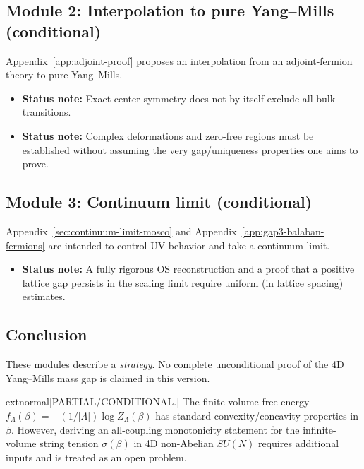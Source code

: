 \subsection{Module 2: Interpolation to pure Yang--Mills (conditional)}
Appendix~\ref{app:adjoint-proof} proposes an interpolation from an adjoint-fermion theory to pure Yang--Mills.
\begin{itemize}
    \item \textbf{Status note:} Exact center symmetry does not by itself exclude all bulk transitions.
    \item \textbf{Status note:} Complex deformations and zero-free regions must be established without assuming the very gap/uniqueness properties one aims to prove.
\end{itemize}

\subsection{Module 3: Continuum limit (conditional)}
Appendix~\ref{sec:continuum-limit-mosco} and Appendix~\ref{app:gap3-balaban-fermions} are intended to control UV behavior and take a continuum limit.
\begin{itemize}
    \item \textbf{Status note:} A fully rigorous OS reconstruction and a proof that a positive lattice gap persists in the scaling limit require uniform (in lattice spacing) estimates.
\end{itemize}

\subsection{Conclusion}
These modules describe a \emph{strategy}.
No complete unconditional proof of the 4D Yang--Mills mass gap is claimed in this version.


\begin{theorem}
\label{thm:free-energy-convexity}
	extnormal{[PARTIAL/CONDITIONAL.]}
The finite-volume free energy $f_\Lambda(\beta)=-(1/|\Lambda|)\log Z_\Lambda(\beta)$ has standard convexity/concavity properties in $\beta$.
However, deriving an all-coupling monotonicity statement for the infinite-volume string tension $\sigma(\beta)$ in 4D non-Abelian $SU(N)$ requires additional inputs and is treated as an open problem.
\end{theorem}

